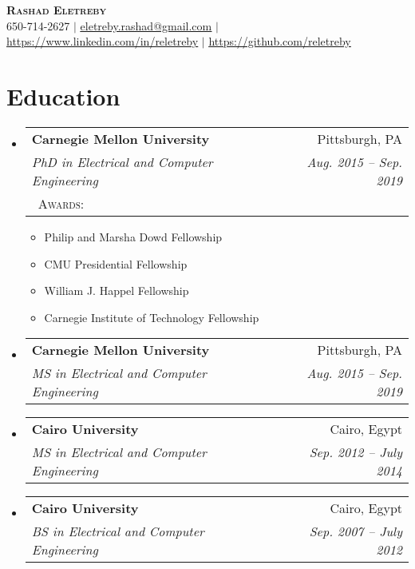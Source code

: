 \documentclass[letterpaper,11pt]{article}
\makeatletter
\newcommand{\resumeItem}[1]{
  \item\small{
    {#1 \vspace{-2pt}}
  }
}
\newcommand{\resumeSubheading}[4]{
  \vspace{-2pt}\item
    \begin{tabular*}{0.97\textwidth}[t]{l@{\extracolsep{\fill}}r}
      \textbf{#1} & #2 \\
      \textit{\small#3} & \textit{\small #4} \\
    \end{tabular*}\vspace{-7pt}
}
\newcommand{\resumeSubheadingInfo}[5]{
  \vspace{-2pt}\item
    \begin{tabular*}{0.97\textwidth}[t]{l@{\extracolsep{\fill}}r}
      \textbf{#1} & #2 \\
      \textit{\small#3} & \textit{\small #4} \\
      \textsc{~#5} & \\
    \end{tabular*}\vspace{-7pt}
}
\newcommand{\resumeSubHeadingListStart}{\begin{itemize}[leftmargin=0.15in, label={}]}
\newcommand{\resumeSubHeadingListEnd}{\end{itemize}}
\newcommand{\resumeItemListStart}{\begin{itemize}}
\newcommand{\resumeItemListEnd}{\end{itemize}\vspace{-4.5pt}}
\makeatother
\begin{document}

\begin{center}
    \textbf{\Huge \scshape Rashad Eletreby} \\ \vspace{1pt}
    \small 650-714-2627 $|$ \href{mailto:eletreby.rashad@gmail.com}{\underline{eletreby.rashad@gmail.com}} $|$ 
    \href{https://www.linkedin.com/in/reletreby}{\underline{https://www.linkedin.com/in/reletreby}} $|$
    \href{https://github.com/reletreby}{\underline{https://github.com/reletreby}}
\end{center}


\section{Education}
  \resumeSubHeadingListStart
    \resumeSubheadingInfo
      {Carnegie Mellon University}{Pittsburgh, PA}
      {PhD in Electrical and Computer Engineering}{Aug. 2015 -- Sep. 2019}
      {Awards:}
      \resumeItemListStart
            \resumeItem{Philip and Marsha Dowd Fellowship}
            \resumeItem{CMU Presidential Fellowship}
            \resumeItem{William J. Happel Fellowship}
            \resumeItem{Carnegie Institute of Technology Fellowship}
 \resumeItemListEnd
      
     \vspace{1mm}
    \resumeSubheading
      {Carnegie Mellon University}{Pittsburgh, PA}
      {MS in Electrical and Computer Engineering}{Aug. 2015 -- Sep. 2019}
      
       \vspace{1mm}
    \resumeSubheading
      {Cairo University}{Cairo, Egypt}
      {MS in Electrical and Computer Engineering}{Sep. 2012 -- July 2014}
      
      \vspace{1mm}
    \resumeSubheading
      {Cairo University}{Cairo, Egypt}
      {BS in Electrical and Computer Engineering}{Sep. 2007 -- July 2012}
  \resumeSubHeadingListEnd
\end{document}
